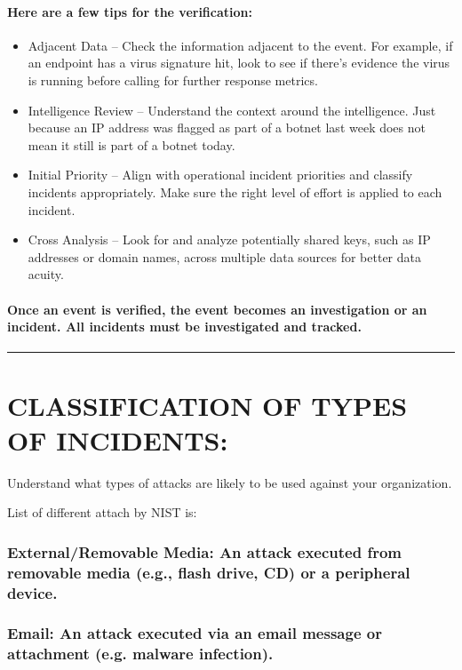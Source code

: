 \documentclass[10pt,british,english]{article}
\begin{document}
\paragraph*{Here are a few tips for the verification:}
\begin{itemize}
\item Adjacent Data -- Check the information adjacent to the event. For
example, if an endpoint has a virus signature hit, look to see if
there\textquoteright s evidence the virus is running before calling
for further response metrics.
\item Intelligence Review -- Understand the context around the intelligence.
Just because an IP address was flagged as part of a botnet last week
does not mean it still is part of a botnet today.
\item Initial Priority -- Align with operational incident priorities and
classify incidents appropriately. Make sure the right level of effort
is applied to each incident.
\item Cross Analysis -- Look for and analyze potentially shared keys, such
as IP addresses or domain names, across multiple data sources for
better data acuity.
\end{itemize}

\paragraph{Once an event is verified, the event becomes an investigation or
an incident. All incidents must be investigated and tracked.}

\rule[0.5ex]{1\columnwidth}{1pt}

\section{CLASSIFICATION OF TYPES OF INCIDENTS:}

Understand what types of attacks are likely to be used against your
organization. 

List of different attach by NIST is:

\subsubsection{External/Removable Media: An attack executed from removable media
(e.g., flash drive, CD) or a peripheral device.}

\subsubsection{Email: An attack executed via an email message or attachment (e.g.
malware infection).}
\end{document}
